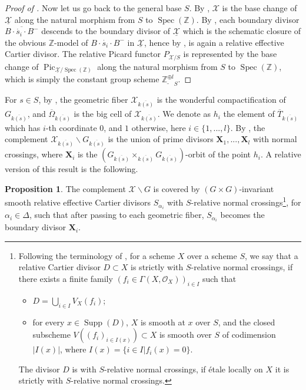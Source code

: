 \documentclass[11pt, reqno]{amsart}
\theoremstyle{plain}
\theoremstyle{definition}
\newtheorem{proposition}[theorem]{Proposition}
\DeclareMathOperator{\Pic}{Pic}    %
\DeclareMathOperator{\Supp}{Supp}
\DeclareMathOperator{\Spec}{Spec}		%
\begin{document}
\begin{proof}[Proof of ]
   Now let us go back to the general base $S$. By , $\mathcal{X}$ is the base change of $\underline{\mathcal{X}}$ along the natural morphism from $S$ to $\Spec(\mathbb{Z})$. By , each boundary divisor $\overline{B\cdot \dot{s_i} \cdot B^-}$ descends to the boundary divisor of $\underline{\mathcal{X}}$ which is the schematic closure of the obvious $\mathbb{Z}$-model of $B\cdot \dot{s_i} \cdot B^-$ in $\underline{\mathcal{X}}$, hence by \cite[056Q]{stacks-project}, is again a relative effective Cartier divisor. The relative Picard functor $P_{\mathcal{X}/S}$ is represented by the base change of $\Pic_{\underline{\mathcal{X}}/\Spec(\mathbb{Z})}$ along the natural morphism from $S$ to $\Spec(\mathbb{Z})$, which is simply the constant group scheme $\underline{\mathbb{Z}^{\oplus l}}_S$.
\end{proof}

For $s\in S$, by , the geometric fiber $\mathcal{X}_{\overline{k(s)}}$ is the wonderful compactification of $G_{\overline{k(s)}}$, and $\overline{\Omega}_{\overline{k(s)}}$ is the big cell of $\mathcal{X}_{\overline{k(s)}}$. We denote as $h_i$ the element of $\overline{T}_{\overline{k(s)}}$ which has $i$-th coordinate $0$, and $1$ otherwise, here $i\in\{1,...,l\}$. By \cite[Theorem~6.1.8 (ii)]{BrionKumar}, the complement $\mathcal{X}_{\overline{k(s)}}\backslash G_{\overline{k(s)}}$ is the union of prime divisors $\mathbf{X}_1,...,\mathbf{X}_l$ with normal crossings, where $\mathbf{X}_i$ is the $(G_{\overline{k(s)}}\times_{\overline{k(s)}}G_{\overline{k(s)}})$-orbit of the point $h_i$. A relative version of this result is the following.

\begin{proposition}\label{boundarydivisors}
    The complement $\mathcal{X}\backslash G$ is covered by $(G\times G)$-invariant smooth relative effective Cartier divisors $S_{\alpha_i}$ with $S$-relative normal crossings\footnote{Following the terminology of \cite[exposé~XIII, 2.1]{SGA1}, for a scheme $X$ over a scheme $S$, we say that a relative Cartier divisor $D\subset X$ is strictly with $S$-relative normal crossings, if there exists a finite family $(f_i\in \Gamma(X,\mathcal{O}_X))_{i\in I}$ such that 
    \begin{itemize}
        \item $D=\bigcup_{i\in I}V_X(f_i)$;
        \item for every $x \in \Supp(D)$, $X$ is smooth at $x$ over $S$, and 
     the closed subscheme $V((f_i)_{i\in I(x)})\subset X$ is smooth over $S$ of codimension $ \vert I(x)\vert$, where $I(x)=\{i\in I\vert f_i(x)=0\}$. 
    \end{itemize}
    The divisor $D$ is with $S$-relative normal crossings, if étale locally on $X$ it is strictly with $S$-relative normal crossings. 
    }, 
    for $\alpha_i \in \Delta$, such that after passing to each geometric fiber, $S_{\alpha_i}$ becomes the boundary divisor $\mathbf{X}_i$. 
\end{proposition}
\end{document}
